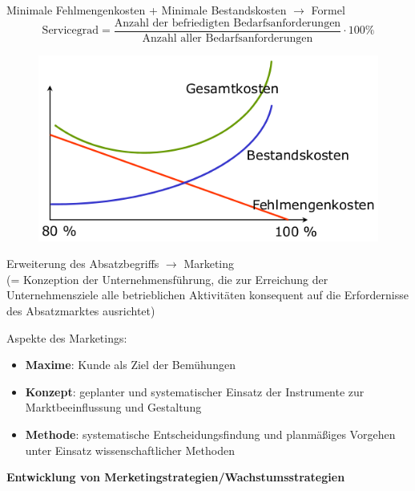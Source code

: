 \documentclass[a4paper,11pt, twoside]{article}
\begin{document}
Minimale Fehlmengenkosten + Minimale Bestandskosten $\rightarrow$ Formel
\begin{equation}
\text{Servicegrad} = \frac{\text{Anzahl der befriedigten Bedarfsanforderungen}}{\text{Anzahl aller Bedarfsanforderungen}} \cdot 100\%
\end{equation}
\begin{figure}[h]
 \begin{center}
   \includegraphics[scale=0.3]{bilder/servicegrad.png}
 \end{center}
\end{figure}

Erweiterung des Absatzbegriffs $\rightarrow$ Marketing\\ 
(= Konzeption der Unternehmensführung, die zur Erreichung der Unternehmensziele alle betrieblichen Aktivitäten konsequent auf die Erfordernisse des Absatzmarktes ausrichtet)

Aspekte des Marketings:
\begin{itemize}
	\item \textbf{Maxime}: Kunde als Ziel der Bemühungen
	\item  \textbf{Konzept}: geplanter und systematischer Einsatz der Instrumente zur Marktbeeinflussung und Gestaltung
	\item \textbf{Methode}: systematische Entscheidungsfindung und planmäßiges Vorgehen unter Einsatz wissenschaftlicher Methoden
\end{itemize}

\textbf{Entwicklung von Merketingstrategien/Wachstumsstrategien} 
\end{document}
